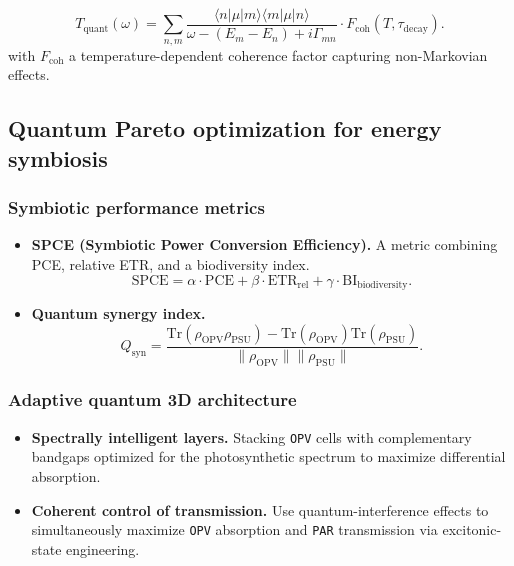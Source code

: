 \documentclass[12pt, a4paper]{article}
\begin{document}
\begin{equation}
\label{eq:quantum_transfer}
T_{\text{quant}}(\omega) = \sum_{n,m} \frac{\langle n | \mu | m \rangle \langle m | \mu | n \rangle}{\omega - (E_m - E_n) + i\Gamma_{mn}} \cdot F_{\text{coh}}(T, \tau_{\text{decay}}).
\end{equation}
with $F_{\text{coh}}$ a temperature-dependent coherence factor capturing non-Markovian effects.

\subsection{Quantum Pareto optimization for energy symbiosis}

\subsubsection{Symbiotic performance metrics}

\begin{itemize}
    \item \textbf{SPCE (Symbiotic Power Conversion Efficiency).} A metric combining PCE, relative ETR, and a biodiversity index.
    \begin{equation}
    \label{eq:spce}
    \text{SPCE} = \alpha \cdot \text{PCE} + \beta \cdot \text{ETR}_{\text{rel}} + \gamma \cdot \text{BI}_{\text{biodiversity}}.
    \end{equation}
    
    \item \textbf{Quantum synergy index.}
    \begin{equation}
    Q_{\text{syn}} = \frac{\text{Tr}(\rho_{\text{OPV}}\rho_{\text{PSU}}) - \text{Tr}(\rho_{\text{OPV}})\text{Tr}(\rho_{\text{PSU}})}{\|\rho_{\text{OPV}}\| \|\rho_{\text{PSU}}\|}.
    \end{equation}
\end{itemize}

\subsubsection{Adaptive quantum 3D architecture}

\begin{itemize}
    \item \textbf{Spectrally intelligent layers.} Stacking \texttt{OPV} cells with complementary bandgaps optimized for the photosynthetic spectrum to maximize differential absorption.
    
    \item \textbf{Coherent control of transmission.} Use quantum-interference effects to simultaneously maximize \texttt{OPV} absorption and \texttt{PAR} transmission via excitonic-state engineering.
\end{itemize}
\end{document}
